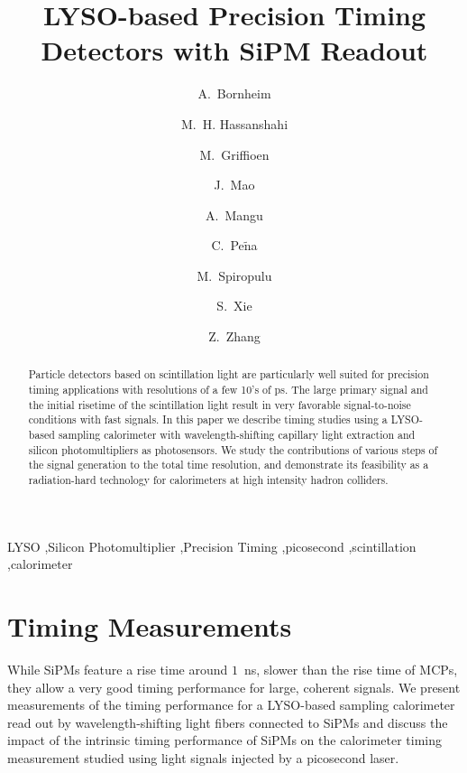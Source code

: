 \documentclass[preprint,1p]{elsarticle}
\begin{document}
  
\linenumbers

\begin{frontmatter}

\title{LYSO-based Precision Timing Detectors with SiPM Readout}

\author[1]{A.~Bornheim}
\author[2]{M.~H. Hassanshahi}
\author[1]{M.~Griffioen}
\author[1]{J.~Mao}
\author[1]{A.~Mangu}
\author[1]{C.~Pe$\tilde{\mathrm{n}}$a}
\author[1]{M.~Spiropulu}
\author[1]{S.~Xie }
\author[1]{Z.~Zhang}
\address[1]{California Institute of Technology, Pasadena, CA, USA}
\address[2]{Institute for Research in Fundamental Science, Tehran, Iran}


\begin{abstract}
Particle detectors based on scintillation light are particularly well suited for precision timing applications with 
resolutions of a few 10's of ps. The large primary signal and the initial risetime of the scintillation
light result in very favorable signal-to-noise conditions with fast signals. In this paper we describe timing 
studies using a LYSO-based sampling calorimeter with wavelength-shifting capillary light extraction and silicon
photomultipliers as photosensors. We study the contributions of various steps of the signal generation to 
the total time resolution, and demonstrate its feasibility as a radiation-hard technology for calorimeters
at high intensity hadron colliders.
\end{abstract}

\begin{keyword}
LYSO \sep Silicon Photomultiplier \sep Precision Timing \sep picosecond \sep scintillation \sep calorimeter
\end{keyword}

\end{frontmatter}

%
%

%
%
  
%
%
  
%
%

\section{Timing Measurements} 

While SiPMs feature a rise time around $1$~ns, slower than the rise time of MCPs, they
allow a very good timing performance for large, coherent signals. We present 
measurements of the timing performance for a
LYSO-based sampling calorimeter read out by wavelength-shifting light fibers
connected to SiPMs and discuss the impact of
the intrinsic timing performance of SiPMs on the calorimeter timing measurement
studied using light signals injected by a picosecond laser.
\end{document}

